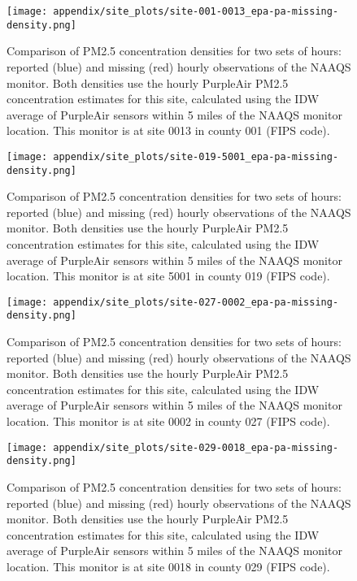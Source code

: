 \begin{figure}
\centering
\texttt{[image: appendix/site\_plots/site-001-0013\_epa-pa-missing-density.png]}
\caption{Comparison of PM2.5 concentration densities for two sets of hours: reported (blue) and missing (red) hourly observations of the NAAQS monitor. Both densities use the hourly PurpleAir PM2.5 concentration estimates for this site, calculated using the IDW average of PurpleAir sensors within 5 miles of the NAAQS monitor location. This monitor is at site 0013 in county 001 (FIPS code).}
\label{fig:missing-density_001-0013}
\end{figure}






\begin{figure}
\centering
\texttt{[image: appendix/site\_plots/site-019-5001\_epa-pa-missing-density.png]}
\caption{Comparison of PM2.5 concentration densities for two sets of hours: reported (blue) and missing (red) hourly observations of the NAAQS monitor. Both densities use the hourly PurpleAir PM2.5 concentration estimates for this site, calculated using the IDW average of PurpleAir sensors within 5 miles of the NAAQS monitor location. This monitor is at site 5001 in county 019 (FIPS code).}
\label{fig:missing-density_019-5001}
\end{figure}

\begin{figure}
\centering
\texttt{[image: appendix/site\_plots/site-027-0002\_epa-pa-missing-density.png]}
\caption{Comparison of PM2.5 concentration densities for two sets of hours: reported (blue) and missing (red) hourly observations of the NAAQS monitor. Both densities use the hourly PurpleAir PM2.5 concentration estimates for this site, calculated using the IDW average of PurpleAir sensors within 5 miles of the NAAQS monitor location. This monitor is at site 0002 in county 027 (FIPS code).}
\label{fig:missing-density_027-0002}
\end{figure}

\begin{figure}
\centering
\texttt{[image: appendix/site\_plots/site-029-0018\_epa-pa-missing-density.png]}
\caption{Comparison of PM2.5 concentration densities for two sets of hours: reported (blue) and missing (red) hourly observations of the NAAQS monitor. Both densities use the hourly PurpleAir PM2.5 concentration estimates for this site, calculated using the IDW average of PurpleAir sensors within 5 miles of the NAAQS monitor location. This monitor is at site 0018 in county 029 (FIPS code).}
\label{fig:missing-density_029-0018}
\end{figure}

